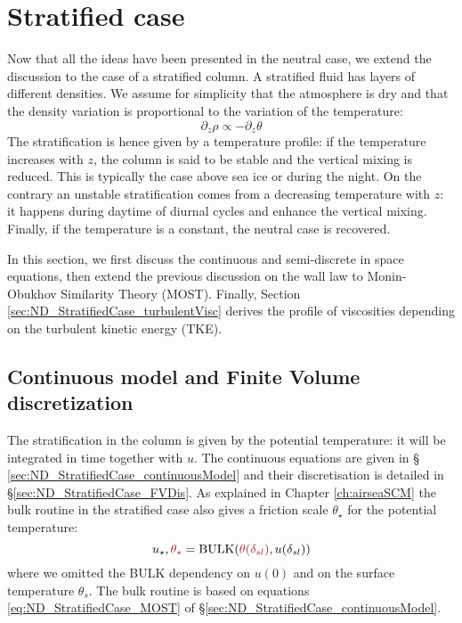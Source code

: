 \section{Stratified case}
\label{sec:ND_StratifiedCase}
Now that all the ideas have been presented in the neutral case,
we extend the discussion to the case of a stratified column.
A stratified fluid has layers of different densities.
We assume for simplicity that the atmosphere
is dry and that the density variation is
proportional to the variation of the temperature:
\begin{equation}
	\partial_z \rho \propto
	- \partial_z \theta
\end{equation}
The stratification is hence given by a temperature profile:
if the temperature increases with $z$, the column is said
to be stable and the vertical mixing is reduced. This is
typically the case above sea ice or during the night.
On the contrary an unstable stratification comes from
a decreasing temperature with $z$: it happens
during daytime of diurnal cycles and enhance the
vertical mixing.
%
Finally, if the temperature is a constant, the neutral case is
recovered.
\par
In this section, we first discuss the continuous and semi-discrete in space
equations, then extend the previous discussion on the wall law to
Monin-Obukhov Similarity Theory (MOST).
Finally, Section \ref{sec:ND_StratifiedCase_turbulentVisc} derives the
profile of viscosities depending on the turbulent kinetic energy
(TKE).
\subsection{Continuous model and Finite Volume discretization}
The stratification in the column is given by the
potential temperature: it will be integrated in time
together with $u$.
The continuous equations are given in \S
\ref{sec:ND_StratifiedCase_continuousModel}
and their discretisation is detailed in
\S \ref{sec:ND_StratifiedCase_FVDis}.
As explained in Chapter \ref{ch:airseaSCM}
the bulk routine in the stratified case
also gives a friction scale $\theta_\star$
for the potential temperature:
\begin{equation}
	u_\star, \emphase{\theta_\star} =
	{\rm BULK}(\emphase{\theta(\delta_{sl})},
	u(\delta_{sl}))
\end{equation}
where we omitted the BULK dependency on
$u(0)$ and on the surface temperature $\theta_s$.
The bulk routine is based on equations
\eqref{eq:ND_StratifiedCase_MOST} of
\S \ref{sec:ND_StratifiedCase_continuousModel}.
